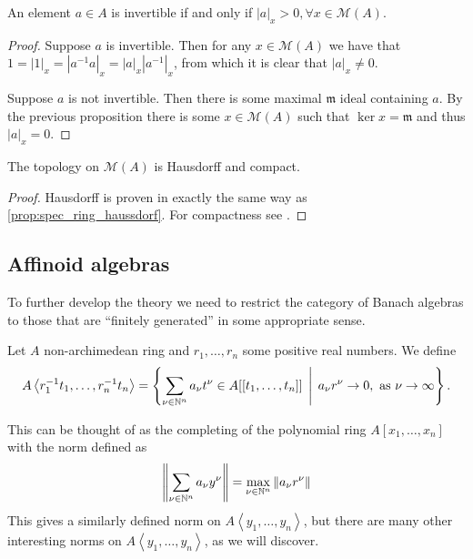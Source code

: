 \begin{corollary}\label{cor:non_vanish_invertible}
	An element $a \in A$ is invertible if and only if $|a|_x > 0, \forall x \in \mathcal{M} (A)$.
\end{corollary}
\begin{proof}
	\ltr
	Suppose $a $ is invertible. Then for any  $x \in \mathcal{M} (A)$ we have that $1 = |1|_x = |a^{-1}a|_x = |a|_x |a^{-1}|_x$, from which it is clear that $|a|_x \ne 0$. 

	\rtl Suppose $a$ is not invertible. Then there is some maximal $\mathfrak{m}  $ ideal containing $a$. 
	By the previous proposition there is some $x \in \mathcal{M} (A)$ such that $\ker x = \mathfrak{m} $ and thus $|a|_x = 0$. 
\end{proof}

\begin{proposition}
	The topology on $\mathcal{M} (A)$ is Hausdorff and compact. 
\end{proposition}
\begin{proof}
	Hausdorff is proven in exactly the same way as \cref{prop:spec_ring_haussdorf}.
	For compactness see \cite[][thm.\ 1.2.1]{berkovichSpectralTheoryAnalytic2012}.
\end{proof}
\subsection{Affinoid algebras} \label{sec:affinoid_algebras}
To further develop the theory we need to restrict the category of Banach algebras to those that are ``finitely generated'' in some appropriate sense. 

\begin{definition}
	Let $A$ non-archimedean ring and $r_1, \ldots, r_n$ some positive real numbers. We define \[
		A \left<r_1^{-1}t_1, \ldots, r_{n}^{-1} t_n \right> = \left\{\sum_{\nu \in \N^{n}}^{} a_\nu t^{\nu} \in A[[t_1,\ldots, t_n]]\st a_\nu r^{\nu} \to 0, \text{ as } \nu \to \infty\right\} 
	.\] 
\end{definition}
This can be thought of as the completing of the polynomial ring $A[x_1, \ldots, x_n]$ with the norm defined as 
\begin{equation}\label{eq:norm_tate}
	\left\| \sum_{\nu \in \mathbb{N}^{n}} a_\nu y^{\nu}\right\| = \max_{\nu \in \mathbb{N}^{n}} \|a_\nu r^{\nu}\|
\end{equation}
This gives a similarly defined norm on $A\left<y_1, \ldots, y_n \right>$, but there are many other interesting norms on $A \left<y_1, \ldots, y_n \right>$, as we will discover. 



